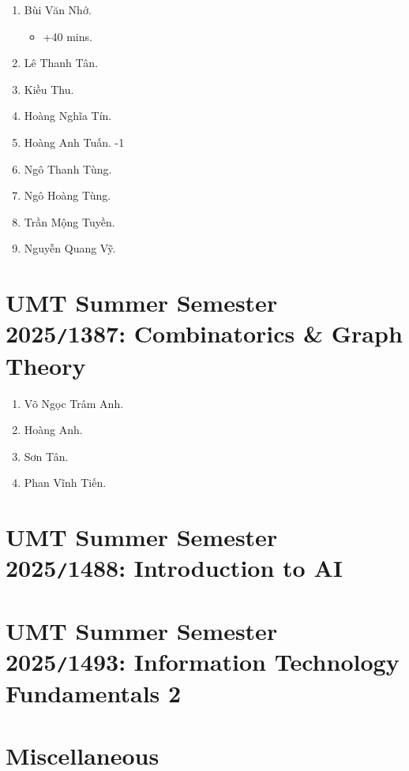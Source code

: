 \documentclass{article}
\begin{document}
\begin{enumerate}
	\item {\sc Bùi Văn Nhớ}.
	\begin{itemize}
		\item +40 mins.
	\end{itemize}
	\item {\sc Lê Thanh Tân.}
	\item {\sc Kiều Thu.}
	\item {\sc Hoàng Nghĩa Tín.}
	\item {\sc Hoàng Anh Tuấn.} -1
	\item {\sc Ngô Thanh Tùng.}
	\item {\sc Ngô Hoàng Tùng.}
	\item {\sc Trần Mộng Tuyền.}
	\item {\sc Nguyễn Quang Vỹ.}	
\end{enumerate}


\section{UMT Summer Semester 2025{\tt/}1387: Combinatorics \& Graph Theory}

\begin{enumerate}
	\item {\sc Võ Ngọc Trâm Anh.}
	\item {\sc Hoàng Anh.}
	\item {\sc Sơn Tân.}
	\item {\sc Phan Vĩnh Tiến.}
\end{enumerate}


\section{UMT Summer Semester 2025{\tt/}1488: Introduction to AI}


\section{UMT Summer Semester 2025{\tt/}1493: Information Technology Fundamentals 2}


\section{Miscellaneous}


\printbibliography[heading=bibintoc]
	
\end{document}
